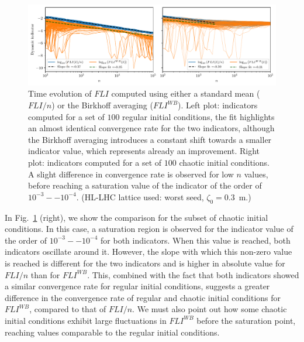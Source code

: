 \begin{figure}[htp]
    \centering
    \includegraphics[width=1.0\textwidth]{6_lhc_dynamic_indicators/figs/updated/fli_vs_flibk_idx_2.pdf}
    \caption{Time evolution of $FLI$ computed using either a standard mean ($FLI/n$) or the Birkhoff averaging ($FLI^{WB}$). Left plot: indicators computed for a set of $100$ regular initial conditions, the fit highlights an almost identical convergence rate for the two indicators, although the Birkhoff averaging introduces a constant shift towards a smaller indicator value, which represents already an improvement. Right plot: indicators computed for a set of $100$ chaotic initial conditions. A slight difference in convergence rate is observed for low $n$ values, before reaching a saturation value of the indicator of the order of $10^{-3}--10^{-4}$. (HL-LHC lattice used: worst seed, $\zeta_0=$\SI{0.3}{\meter}.)}
    \label{fig:fli_compare_mean_birk_2}
\end{figure}

In Fig.~\ref{fig:fli_compare_mean_birk_2} (right), we show the comparison for the subset of chaotic initial conditions. In this case, a saturation region is observed for the indicator value of the order of $10^{-3}--10^{-4}$ for both indicators. When this value is reached, both indicators oscillate around it. However, the slope with which this non-zero value is reached is different for the two indicators and is higher in absolute value for $FLI/n$ than for $FLI^{WB}$. This, combined with the fact that both indicators showed a similar convergence rate for regular initial conditions, suggests a greater difference in the convergence rate of regular and chaotic initial conditions for $FLI^{WB}$, compared to that of $FLI/n$. We must also point out how some chaotic initial conditions exhibit large fluctuations in $FLI^{WB}$ before the saturation point, reaching values comparable to the regular initial conditions. %

